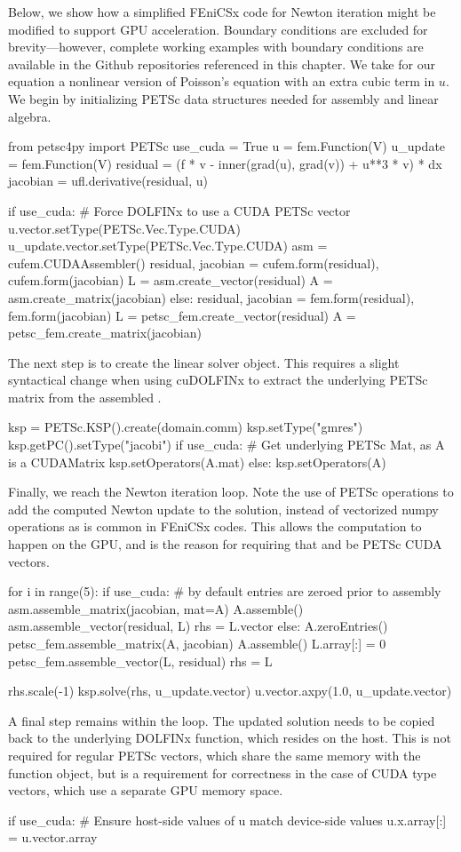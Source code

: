 Below, we show how a simplified FEniCSx code for Newton iteration might be modified to support GPU acceleration. Boundary conditions are excluded for brevity---however, complete working examples with boundary conditions are available in the Github repositories referenced in this chapter. We take for our equation a nonlinear version of Poisson's equation with an extra cubic term in $u$. We begin by initializing PETSc data structures needed for assembly and linear algebra.
\begin{python}
from petsc4py import PETSc
use_cuda = True
u = fem.Function(V)
u_update = fem.Function(V)
residual = (f * v - inner(grad(u), grad(v)) + u**3 * v) * dx
jacobian = ufl.derivative(residual, u)

if use_cuda:
  # Force DOLFINx to use a CUDA PETSc vector
  u.vector.setType(PETSc.Vec.Type.CUDA)
  u_update.vector.setType(PETSc.Vec.Type.CUDA)
  asm = cufem.CUDAAssembler()
  residual, jacobian = cufem.form(residual), cufem.form(jacobian)
  L = asm.create_vector(residual)
  A = asm.create_matrix(jacobian)
else:
  residual, jacobian = fem.form(residual), fem.form(jacobian)
  L = petsc_fem.create_vector(residual)
  A = petsc_fem.create_matrix(jacobian)
\end{python}
The next step is to create the linear solver object. This requires a slight syntactical change when using cuDOLFINx to extract the underlying PETSc matrix from the assembled .
\begin{python}
ksp = PETSc.KSP().create(domain.comm)
ksp.setType("gmres")
ksp.getPC().setType("jacobi")
if use_cuda:
  # Get underlying PETSc Mat, as A is a CUDAMatrix
  ksp.setOperators(A.mat)
else:
  ksp.setOperators(A)
\end{python}
Finally, we reach the Newton iteration loop. Note the use of PETSc operations to add the computed Newton update to the solution, instead of vectorized numpy operations as is common in FEniCSx codes. This allows the computation to happen on the GPU, and is the reason for requiring that  and  be PETSc CUDA vectors.
\begin{python}
for i in range(5):
  if use_cuda:
    # by default entries are zeroed prior to assembly
    asm.assemble_matrix(jacobian, mat=A)
    A.assemble()
    asm.assemble_vector(residual, L)
    rhs = L.vector
  else:
    A.zeroEntries()
    petsc_fem.assemble_matrix(A, jacobian)
    A.assemble()
    L.array[:] = 0
    petsc_fem.assemble_vector(L, residual)
    rhs = L

  rhs.scale(-1)
  ksp.solve(rhs, u_update.vector)
  u.vector.axpy(1.0, u_update.vector)
\end{python}
A final step remains within the loop. The updated solution needs to be copied back to the underlying DOLFINx function, which resides on the host. This is not required for regular PETSc vectors, which share the same memory with the function object, but is a requirement for correctness in the case of CUDA type vectors, which use a separate GPU memory space.
\begin{python}
  if use_cuda:
    # Ensure host-side values of u match device-side values
    u.x.array[:] = u.vector.array
\end{python}

